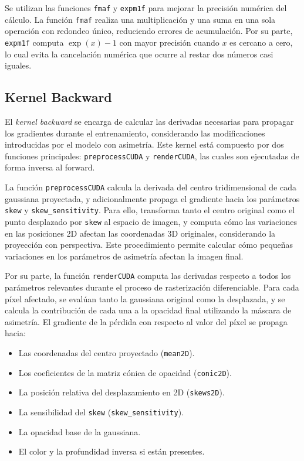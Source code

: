 Se utilizan las funciones \texttt{fmaf} y \texttt{expm1f} para mejorar la precisión numérica del cálculo. La función \texttt{fmaf} realiza una multiplicación y una suma en una sola operación con redondeo único, reduciendo errores de acumulación. Por su parte, \texttt{expm1f} computa $\exp(x) - 1$ con mayor precisión cuando $x$ es cercano a cero, lo cual evita la cancelación numérica que ocurre al restar dos números casi iguales.

\subsection{Kernel Backward}


El \textit{kernel backward} se encarga de calcular las derivadas necesarias para propagar los gradientes durante el entrenamiento, considerando las modificaciones introducidas por el modelo con asimetría. Este kernel está compuesto por dos funciones principales: \texttt{preprocessCUDA} y \texttt{renderCUDA}, las cuales son ejecutadas de forma inversa al forward.

La función \texttt{preprocessCUDA} calcula la derivada del centro tridimensional de cada gaussiana proyectada, y adicionalmente propaga el gradiente hacia los parámetros \texttt{skew} y \texttt{skew\_sensitivity}. Para ello, transforma tanto el centro original como el punto desplazado por \texttt{skew} al espacio de imagen, y computa cómo las variaciones en las posiciones 2D afectan las coordenadas 3D originales, considerando la proyección con perspectiva. Este procedimiento permite calcular cómo pequeñas variaciones en los parámetros de asimetría afectan la imagen final.

Por su parte, la función \texttt{renderCUDA} computa las derivadas respecto a todos los parámetros relevantes durante el proceso de rasterización diferenciable. Para cada píxel afectado, se evalúan tanto la gaussiana original como la desplazada, y se calcula la contribución de cada una a la opacidad final utilizando la máscara de asimetría. El gradiente de la pérdida con respecto al valor del píxel se propaga hacia:

\begin{itemize}
    \item Las coordenadas del centro proyectado (\texttt{mean2D}).
    \item Los coeficientes de la matriz cónica de opacidad (\texttt{conic2D}).
    \item La posición relativa del desplazamiento en 2D (\texttt{skews2D}).
    \item La sensibilidad del \texttt{skew} (\texttt{skew\_sensitivity}).
    \item La opacidad base de la gaussiana.
    \item El color y la profundidad inversa si están presentes.
\end{itemize}

